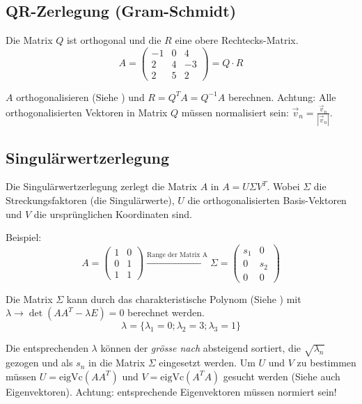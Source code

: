 \subsection{QR-Zerlegung (Gram-Schmidt)}
Die Matrix $Q$ ist orthogonal und die $R$ eine obere Rechtecks-Matrix.
\[A = \begin{pmatrix}
	-1 & 0 & 4 \\
	2 & 4 & -3 \\
	2 & 5 & 2
\end{pmatrix} = Q \cdot R \]

\noindent $A$ orthogonalisieren (Siehe ) und $R = Q^{T}A = Q^{-1}A$ berechnen. Achtung: Alle orthogonalisierten Vektoren in Matrix $Q$ müssen normalisiert sein: $\vec{v}_n = \frac{\vec{v}_n}{|\vec{v}_n|}$.


\subsection{Singulärwertzerlegung}
Die Singulärwertzerlegung zerlegt die Matrix $A$ in $A = U\Sigma V^T$. Wobei $\Sigma$ die Streckungsfaktoren (die Singulärwerte), $U$ die orthogonalisierten Basis-Vektoren und $V$ die ursprünglichen Koordinaten sind.

Beispiel:
\[A = \begin{pmatrix}
	1 & 0 \\
	0 & 1 \\
	1 & 1
\end{pmatrix}
\xrightarrow{\text{Range der Matrix A}}
\Sigma = \begin{pmatrix}
	s_1 & 0 \\
	0 & s_2 \\
	0 & 0
\end{pmatrix}
\]

\noindent Die Matrix $\Sigma$ kann durch das charakteristische Polynom (Siehe ) mit $\lambda \rightarrow \det(AA^T - \lambda E) = 0$ berechnet werden. \[\lambda = \{\lambda_1 = 0; \lambda_2 = 3; \lambda_3 = 1\}\]

\noindent Die entsprechenden $\lambda$ können der \textit{grösse nach} absteigend sortiert, die $\sqrt{\lambda_n}$ gezogen und als $s_n$ in die Matrix $\Sigma$ eingesetzt werden. Um $U$ und $V$ zu bestimmen müssen $U = \text{eigVc}(AA^T)$ und $V = \text{eigVc}(A^TA)$ gesucht werden (Siehe auch Eigenvektoren). Achtung: entsprechende Eigenvektoren müssen normiert sein!


